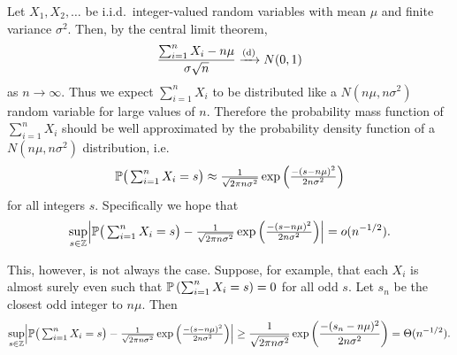 Let $X_1, X_2, \ldots$ be i.i.d.\ integer-valued random variables with mean $\mu$ and finite variance $\sigma^2$. Then, by the central limit theorem,
\begin{equation*}
    \frac{ \sum_{i=1}^n X_i - n \mu }{\sigma \sqrt{n}}
    \todist
    N(0, 1)
\end{equation*}
as $n \to \infty$. Thus we expect $\sum_{i=1}^n X_i$ to be distributed like a $N(n \mu, n \sigma^2)$ random variable for large values of $n$. Therefore the probability mass function of $\sum_{i=1}^n X_i$ should be well approximated by the probability density function of a $N(n \mu, n \sigma^2)$ distribution, i.e.
\begin{equation*}
    \P\big( \textstyle \sum_{i=1}^n X_i = s \big)
    \approx
    \frac{1}{\sqrt{2 \pi n \sigma^2}}  \exp \left(
        \frac{-(s - n \mu)^2}{2 n \sigma^2}
    \right)
\end{equation*}
for all integers $s$. Specifically we hope that
\begin{equation}
    \label{eq:llt-approx}
    \sup_{s \in \Z} \abs*{
        \P\big( \textstyle \sum_{i=1}^n X_i = s \big) 
        -
        \frac{1}{\sqrt{2 \pi n \sigma^2}}  \exp \left(
            \frac{-(s - n \mu)^2}{2 n \sigma^2}
        \right)
    } = \littleo(n^{-1/2}).
\end{equation}

This, however, is not always the case. Suppose, for example, that each $X_i$ is almost surely even such that $\P\left( \sum_{i=1}^n X_i = s \right) = 0$ for all odd $s$. Let $s_n$ be the closest odd integer to $n \mu$. Then
\begin{equation*}
    \sup_{s \in \Z} \abs*{
        \P\big( \textstyle \sum_{i=1}^n X_i = s \big) 
        -
        \frac{1}{\sqrt{2 \pi n \sigma^2}}  \exp \left(
            \frac{-(s - n \mu)^2}{2 n \sigma^2}
        \right)
    }
    \geq
    \frac{1}{\sqrt{2 \pi n \sigma^2}}  \exp \left(
        \frac{-(s_n - n \mu)^2}{2 n \sigma^2}
    \right)
    = 
    \Theta(n^{ -1/2 }).
\end{equation*}

